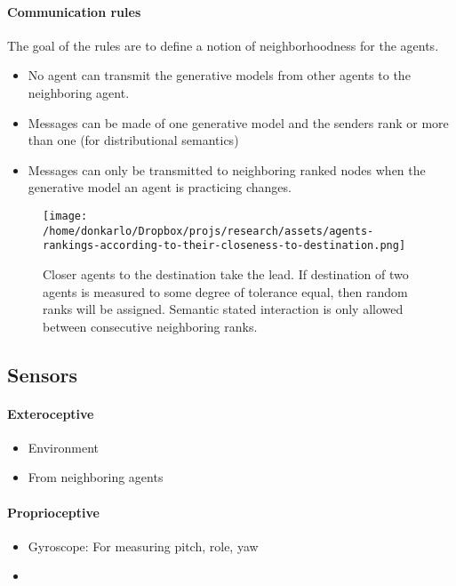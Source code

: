\documentclass{article}
\begin{document}
			\paragraph{Communication rules} The goal of the rules are to define a notion of neighborhoodness for the agents.  
				\begin{itemize}
					\item No agent can transmit the generative models from other agents to the neighboring agent.
					\item Messages can be made of one generative model and the senders rank or more than one (for distributional semantics) 
					\item Messages can only be transmitted to neighboring ranked nodes when the generative model an agent is practicing changes.
				\end{itemize}
			\begin{figure*}
				\centering
				\texttt{[image: /home/donkarlo/Dropbox/projs/research/assets/agents-rankings-according-to-their-closeness-to-destination.png]}
				\caption{Closer agents to the destination take the lead. If destination of two agents is measured to some degree of tolerance equal, then random ranks will be assigned. Semantic stated interaction is only allowed between consecutive neighboring ranks.}
				\label{fig:agents-rankings-according-to-their-closeness-to-destination.png}
			\end{figure*}
		
		
		\subsection{Sensors}
			\paragraph{Exteroceptive}
				\begin{itemize}
					\item Environment
					\item From neighboring agents 
				\end{itemize}
			
			\paragraph{Proprioceptive}
				\begin{itemize}
					\item Gyroscope: For measuring pitch, role, yaw
					\item 
				\end{itemize}
			
\end{document}
